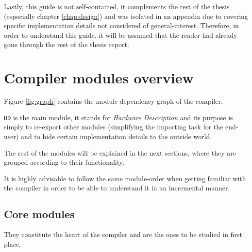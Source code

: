 Lastly, this guide is not self-contained, it complements the rest of
the thesis (especially chapter \ref{chap:design}) and was isolated in
an appendix due to covering specific implementation details not
considered of general-interest. Therefore, in order to understand this
guide, it will be assumed that the reader had already gone through the
rest of the thesis report.

\section{Compiler modules overview}

Figure \ref{fig:graph} contains the module dependency graph of the compiler.

\texttt{HD} is the main module, it stands for \textit{Hardware
  Description} and its purpose is simply to re-export other modules
(simplifying the importing task for the end-user) and to hide certain
implementation details to the outside world.

The rest of the modules will be explained in the next sections, where
they are grouped according to their functionality.

It is highly advisable to follow the same module-order when getting
familiar with the compiler in order to be able to understand it in an
incremental manner.

\subsection{Core modules}

They constitute the heart of the compiler and are the ones to be studied in
first place.

